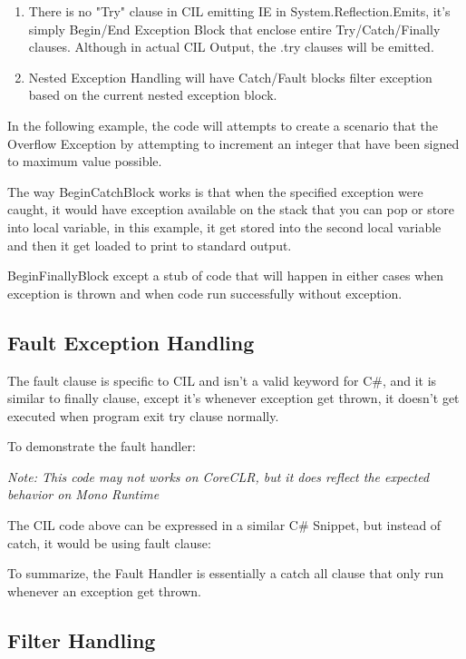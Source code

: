 \begin{enumerate}
\item There is no "Try" clause in CIL emitting IE in System.Reflection.Emits, it's simply Begin/End Exception Block that enclose entire Try/Catch/Finally clauses. Although in actual CIL Output, the .try clauses will be emitted.
\item Nested Exception Handling will have Catch/Fault blocks filter exception based on the current nested exception block.
\end{enumerate}

In the following example, the code will attempts to create a scenario that the Overflow Exception by attempting to increment an integer that have been signed to maximum value possible.



The way BeginCatchBlock works is that when the specified exception were caught, it would have exception available on the stack that you can pop or store into local variable, in this example, it get stored into the second local variable and then it get loaded to print to standard output.

BeginFinallyBlock except a stub of code that will happen in either cases when exception is thrown and when code run successfully without exception.

\newpage

\subsection{Fault Exception Handling}
The fault clause is specific to CIL and isn't a valid keyword for C\#, and it is similar to finally clause, except it's whenever exception get thrown, it doesn't get executed when program exit try clause normally.

To demonstrate the fault handler:



\textit{Note: This code may not works on CoreCLR, but it does reflect the expected behavior on Mono Runtime}

\newpage
The CIL code above can be expressed in a similar C\# Snippet, but instead of catch, it would be using fault clause:



To summarize, the Fault Handler is essentially a catch all clause that only run whenever an exception get thrown.

\subsection{Filter Handling}

